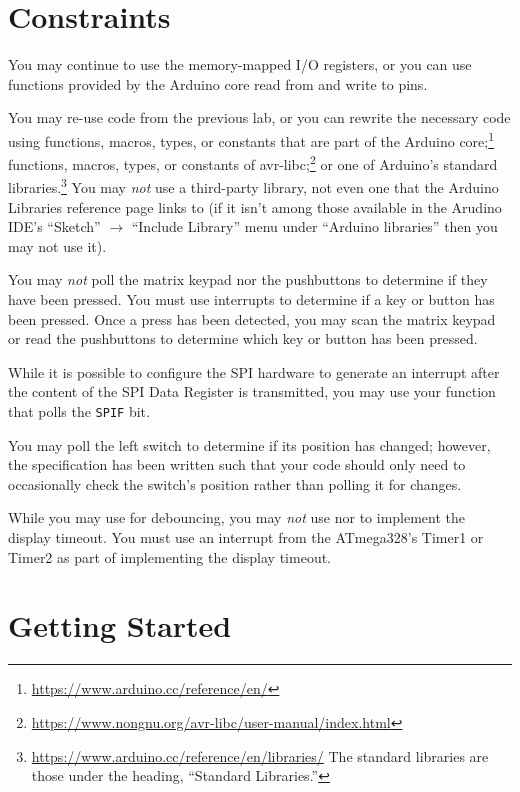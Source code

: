 \section{Constraints}\label{sec:Constraints}

You may continue to use the memory-mapped I/O registers, or you can use
functions provided by the Arduino core read from and write to pins.

You may re-use code from the previous lab, or you can rewrite the necessary
code using functions, macros, types, or constants that are part of the Arduino
core;\footnote{\url{https://www.arduino.cc/reference/en/}} functions, macros,
types, or constants of
avr-libc;\footnote{\url{https://www.nongnu.org/avr-libc/user-manual/index.html}}
or one of Arduino's standard
libraries.\footnote{\url{https://www.arduino.cc/reference/en/libraries/} The
standard libraries are those under the heading, ``Standard Libraries.''} You
may \textit{not} use a third-party library, not even one that the Arduino
Libraries reference page links to (if it isn't among those available in the
Arudino IDE's ``Sketch'' $\rightarrow$ ``Include Library'' menu under
``Arduino libraries'' then you may not use it).

You may \textit{not} poll the matrix keypad nor the pushbuttons to determine
if they have been pressed. You must use interrupts to determine if a key or
button has been pressed. Once a press has been detected, you may scan the
matrix keypad or read the pushbuttons to determine which key or button has
been pressed.

While it is possible to configure the SPI hardware to generate an interrupt
after the content of the SPI Data Register is transmitted, you may use your
 function that polls the \texttt{SPIF} bit.

You may poll the left switch to determine if its position has changed;
however, the specification has been written such that your code should only
need to occasionally check the switch's position rather than polling it for
changes.

While you may use  for debouncing, you may \textit{not} use
 nor  to implement the display timeout.
You must use an interrupt from the ATmega328's Timer1 or Timer2 as part of
implementing the display timeout.

\section{Getting Started} \label{sec:GettingStarted}


